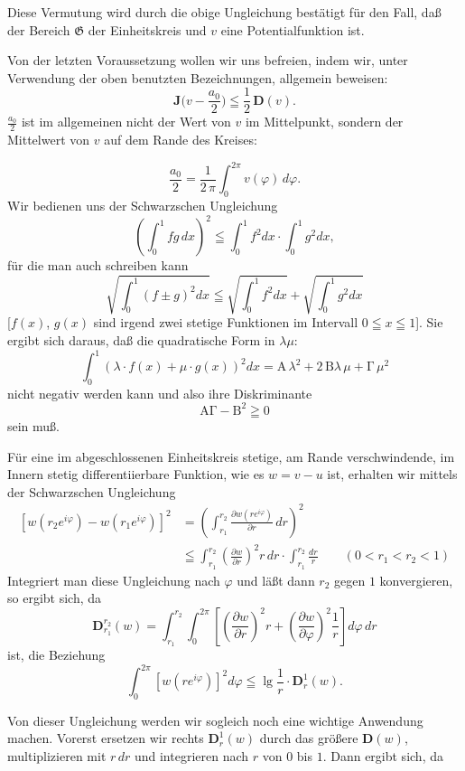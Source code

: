 \documentclass{article}
\begin{document}
Diese Vermutung wird durch die obige Ungleichung bestätigt für den Fall, daß der Bereich $\mathfrak{G}$ der Einheitskreis und $v$ eine Potentialfunktion ist.

Von der letzten Voraussetzung wollen wir uns befreien, indem wir, unter Verwendung der oben benutzten Bezeichnungen, allgemein beweisen:
\[ \mathbf{J}\Big( v - \frac{a_0}{2} \Big) \leqq \frac{1}{2}\,\mathbf{D}(v). \tag{25} \]
$\frac{a_0}{2}$ ist im allgemeinen nicht der Wert von $v$ im Mittelpunkt, sondern der Mittelwert von $v$ auf dem Rande des Kreises:

\[ \frac{a_0}{2} = \frac{1}{2\,\pi} \int_0^{2\pi} v(\varphi)\,d\varphi. \]
Wir bedienen uns der Schwarzschen Ungleichung
\[ \left( \int_0^1 fg\,dx \right)^2 \leqq \int_0^1 f^2 dx \cdot \int_0^1 g^2 dx, \]
für die man auch schreiben kann
\[ \sqrt{\int_0^1 (f \pm g)^2 dx} \leqq \sqrt{\int_0^1 f^2 dx} + \sqrt{\int_0^1 g^2 dx} \]
[$f(x)$, $g(x)$ sind irgend zwei stetige Funktionen im Intervall $0 \leqq x \leqq 1$]. Sie ergibt sich daraus, daß die quadratische Form in $\lambda\mu$:
\[ \int_0^1 (\lambda \cdot f(x) + \mu \cdot g(x))^2 dx = \mathrm{A}\,\lambda^2 + 2\,\mathrm{B}\lambda\,\mu + \mathrm{\Gamma}\,\mu^2 \]
nicht negativ werden kann und also ihre Diskriminante
\[ \mathrm{A}\mathrm{\Gamma} - \mathrm{B}^2 \geqq 0 \]
sein muß.

Für eine im abgeschlossenen Einheitskreis stetige, am Rande verschwindende, im Innern stetig differentiierbare Funktion, wie es $w = v - u$ ist, erhalten wir mittels der Schwarzschen Ungleichung
\[ \begin{aligned}
[w(r_2 e^{i\varphi}) - w(r_1 e^{i\varphi})]^2 &= \left( \int_{r_1}^{r_2} \frac{\partial w(r e^{i\varphi})}{\partial r}\,dr \right)^2 \\
&\leqq \int_{r_1}^{r_2} \left(\frac{\partial w}{\partial r}\right)^2 r\,dr \cdot \int_{r_1}^{r_2} \frac{dr}{r} \qquad (0 < r_1 < r_2 < 1)
\end{aligned} \]
Integriert man diese Ungleichung nach $\varphi$ und läßt dann $r_2$ gegen $1$ konvergieren, so ergibt sich, da
\[ \mathbf{D}_{r_1}^{r_2}(w) = \int_{r_1}^{r_2} \int_0^{2\pi} \left[ \left(\frac{\partial w}{\partial r}\right)^2 r + \left(\frac{\partial w}{\partial \varphi}\right)^2 \frac{1}{r} \right] d\varphi\,dr \]
ist, die Beziehung
\[ \int_0^{2\pi} [w(r e^{i\varphi})]^2 d\varphi \leqq \lg\frac{1}{r} \cdot \mathbf{D}_r^1(w). \tag{26} \]

Von dieser Ungleichung werden wir sogleich noch eine wichtige Anwendung machen. Vorerst ersetzen wir rechts $\mathbf{D}_r^1(w)$ durch das größere $\mathbf{D}(w)$, multiplizieren mit $r\,dr$ und integrieren nach $r$ von $0$ bis $1$. Dann ergibt sich, da
\end{document}
